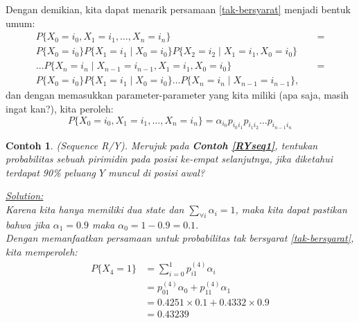 \documentclass[11pt,b5paper,twoside]{book}
\newtheorem{ex}[theorem]{Contoh}
\begin{document}
	\noindent Dengan demikian, kita dapat menarik persamaan \ref{tak-bersyarat} menjadi bentuk umum:
	\begin{equation*}
	\begin{split}
	P\{X_0 = i_0, X_1 = i_1, \dots, X_n = i_n\} &\quad =\\
	 P\{X_0 = i_0\} P\{X_1 = i_1 \mid X_0 = i_0\}P\{X_2 = i_2 \mid X_1 = i_1,X_0 = i_0\} \\\dots P\{X_n = i_n \mid X_{n-1} = i_{n-1} ,X_1 = i_1,X_0 = i_0\} &\quad =\\
	 P\{X_0 = i_0\} P\{X_1 = i_1 \mid X_0 = i_0\}\dots P\{X_n = i_n \mid X_{n-1} = i_{n-1}\},
	\end{split}
	\end{equation*}
	dan dengan memasukkan parameter-parameter yang kita miliki (apa saja, masih ingat kan?), kita peroleh:
	\begin{equation}
		P\{X_0 = i_0, X_1 = i_1, \dots, X_n = i_n\} = \alpha_{i_0} p_{i_0i_1}p_{i_1i_2}\dots p_{i_{n-1}i_n}
	\end{equation}
	
	\begin{ex} (Sequence R/Y). Merujuk pada \textbf{Contoh \ref{RYseq1}}, tentukan probabilitas sebuah pirimidin pada posisi ke-empat selanjutnya, jika diketahui terdapat 90\% peluang $Y$ muncul di posisi awal?
	
	\noindent \underline{Solution:}\\
	Karena kita hanya memiliki dua state dan $\sum_{\forall i} \alpha_i=1$, maka kita dapat pastikan bahwa jika $\alpha_1=0.9$ maka $\alpha_0=1-0.9=0.1$. \\
	Dengan memanfaatkan persamaan untuk probabilitas tak bersyarat \ref{tak-bersyarat}, kita memperoleh:
		\begin{equation*}
		\begin{aligned}
		P\{X_4 = 1\} &=\sum_{i=0}^{1} p_{i1}^{(4)} \alpha_i\\
		&=p_{01}^{(4)}\alpha_0 +p_{11}^{(4)}\alpha_1\\
		&=0.4251 \times 0.1 + 0.4332 \times 0.9 \\
		&= 0.43239 
		\end{aligned}
		\end{equation*}
	\end{ex}
\end{document}
